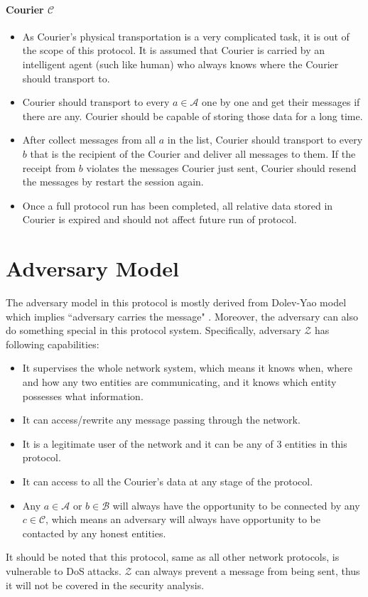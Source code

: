 \paragraph{Courier $\mathcal{C}$}
\begin{itemize}
\item As Courier's physical transportation is a very complicated task, it is out of the scope of this protocol. It is assumed that Courier is carried by an intelligent agent (such like human) who always knows where the Courier should transport to.

\item Courier should transport to every $a \in \mathcal{A}$ one by one and get their messages if there are any. Courier should be capable of storing those data for a long time.

\item After collect messages from all $a$ in the list, Courier should transport to every $b$ that is the recipient of the Courier and deliver all messages to them. If the receipt from $b$ violates the messages Courier just sent, Courier should resend the messages by restart the session again.

\item Once a full protocol run has been completed, all relative data stored in Courier is expired and should not affect future run of protocol.
\end{itemize}

\section{Adversary Model}
The adversary model in this protocol is mostly derived from Dolev-Yao model which implies ``adversary carries the message" \cite{dolev}. Moreover, the adversary can also do something special in this protocol system. Specifically, adversary $\mathcal{Z}$ has following capabilities:
\begin{itemize}
\item It supervises the whole network system, which means it knows when, where and how any two entities are communicating, and it knows which entity possesses what information.
\item It can access/rewrite any message passing through the network.
\item It is a legitimate user of the network and it can be any of 3 entities in this protocol.
\item It can access to all the Courier's data at any stage of the protocol.
\item Any $a \in \mathcal{A}$ or $b \in \mathcal{B}$ will always have the opportunity to be connected by any $c \in \mathcal{C}$, which means an adversary will always have opportunity to be contacted by any honest entities.
\end{itemize}

It should be noted that this protocol, same as all other network protocols, is vulnerable to DoS attacks. $\mathcal{Z}$ can always prevent a message from being sent, thus it will not be covered in the security analysis.
